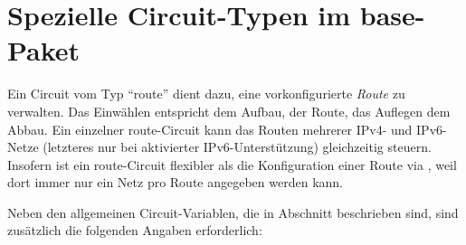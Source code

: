 \section{Spezielle Circuit-Typen im base-Paket}


Ein Circuit vom Typ ``route'' dient dazu, eine vorkonfigurierte \emph{Route}
zu verwalten. Das Einwählen entspricht dem Aufbau, der Route, das Auflegen dem
Abbau. Ein einzelner route-Circuit kann das Routen mehrerer IPv4- und
IPv6-Netze (letzteres nur bei aktivierter IPv6-Unterstützung) gleichzeitig
steuern. Insofern ist ein route-Circuit flexibler als die Konfiguration einer
Route via , weil dort immer nur ein Netz pro Route angegeben
werden kann.

Neben den allgemeinen Circuit-Variablen, die in Abschnitt
 beschrieben sind, sind
zusätzlich die folgenden Angaben erforderlich:

